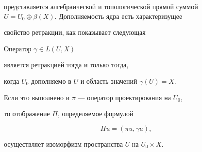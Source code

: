 представляется алгебраической и топологической прямой суммой $U


= U_0 \oplus \beta(X)$. Дополняемость ядра есть характеризущее


свойство ретракции, как показывает следующая





\begin{lems} \label{one}


Оператор $\gamma \in L(U, X)$


является ретракцией тогда и только тогда,


когда $U_0$ дополняемо в $U$ и область значений $\gamma(U)=X$.


Если это выполнено и $\pi$ --- оператор проектирования на $U_0$,


то отображение $\Pi$, определяемое формулой


\begin{equation}


\Pi u=(\pi u, \gamma u), \label{Pi}


\end{equation}


осуществляет изоморфизм пространства $U$ на $U_0


\times X$.


\end{lems}





